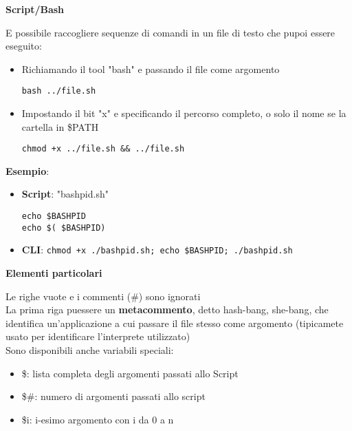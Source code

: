 \begin{flushleft}
  \textbf{Script/Bash} \par 
  \ac{E} possibile raccogliere sequenze di comandi in un file di testo che pu\aco poi 
  essere eseguito:
  \begin{itemize}
    \item Richiamando il tool "bash" e passando il file come argomento
          \begin{center}
            \texttt{bash ../file.sh}
          \end{center}
    \item Impostando il bit "x" e specificando il percorso completo, o solo il 
          nome se la cartella \ace in \$PATH
          \begin{center}
            \texttt{chmod +x ../file.sh \&\& ../file.sh}
          \end{center}
  \end{itemize}
  \textbf{Esempio}: 
  \begin{itemize}
    \item \textbf{Script}: "bashpid.sh"
          \begin{center}
            \texttt{echo \$BASHPID \\ echo \$( \$BASHPID)}
          \end{center}
    \item \textbf{CLI}: \texttt{chmod +x ./bashpid.sh; echo \$BASHPID; ./bashpid.sh}
  \end{itemize}
  \textbf{Elementi particolari}\par 
  Le righe vuote e i commenti (\#) sono ignorati\\
  La prima riga pu\aco essere un \textbf{metacommento}, detto hash-bang, she-bang, che identifica 
  un'applicazione a cui passare il file stesso come argomento (tipicamete usato per identificare l'interprete utilizzato) \\
  Sono disponibili anche variabili speciali:
  \begin{itemize}
    \item \$\@: lista completa degli argomenti passati allo Script
    \item \$\#: numero di argomenti passati allo script 
    \item \$i: i-esimo argomento con i da 0 a n
  \end{itemize}
\end{flushleft}
